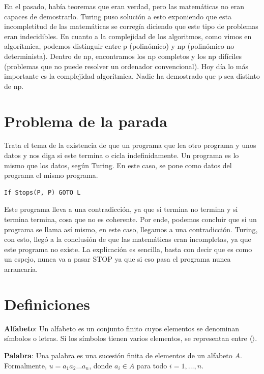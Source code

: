 \documentclass[12pt]{report} %
\begin{document}
En el pasado, había teoremas que eran verdad, pero las matemáticas no
eran capaces de demostrarlo. Turing puso solución a esto exponiendo que
esta incompletitud de las matemáticas se corregía diciendo que este tipo
de problemas eran indecidibles. En cuanto a la complejidad de los
algoritmos, como vimos en algorítmica, podemos distinguir entre p
(polinómico) y np (polinómico no determinista). Dentro de np,
encontramos los np completos y los np difíciles (problemas que no puede
resolver un ordenador convencional). Hoy día lo más importante es la
complejidad algorítmica. Nadie ha demostrado que p sea distinto de np.

\hypertarget{problema-de-la-parada}{%
\section{Problema de la parada}\label{problema-de-la-parada}}

Trata el tema de la existencia de que un programa que lea otro programa
y unos datos y nos diga si este termina o cicla indefinidamente. Un
programa es lo mismo que los datos, según Turing. En este caso, se pone
como datos del programa el mismo programa.

\begin{lstlisting}[language=Python]
If Stops(P, P) GOTO L
\end{lstlisting}

Este programa lleva a una contradicción, ya que si termina no termina y
si termina termina, cosa que no es coherente. Por ende, podemos concluir
que si un programa se llama así mismo, en este caso, llegamos a una
contradicción. Turing, con esto, llegó a la conclusión de que las
matemáticas eran incompletas, ya que este programa no existe. La
explicación es sencilla, basta con decir que es como un espejo, nunca va
a pasar STOP ya que si eso pasa el programa nunca arrancaría.

\hypertarget{definiciones}{%
\section{Definiciones}\label{definiciones}}

\begin{definicion}
\textbf{Alfabeto}: Un alfabeto es un conjunto finito cuyos elementos se denominan símbolos o letras. Si los símbolos tienen varios elementos, se representan entre $\langle \rangle$.  
\end{definicion}

\begin{definicion}
\textbf{Palabra}: Una palabra es una sucesión finita de elementos de un alfabeto $A$. Formalmente, $u = a_1 a_2 \ldots a_n$, donde $a_i \in A$ para todo $i = 1, \ldots, n$.  
\end{definicion}
\end{document}
